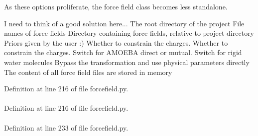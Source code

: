 \-As these options proliferate, the force field class becomes less standalone. 

\-I need to think of a good solution here... \-The root directory of the project \-File names of force fields \-Directory containing force fields, relative to project directory \-Priors given by the user \-:) \-Whether to constrain the charges. \-Whether to constrain the charges. \-Switch for \-A\-M\-O\-E\-B\-A direct or mutual. \-Switch for rigid water molecules \-Bypass the transformation and use physical parameters directly \-The content of all force field files are stored in memory 

\-Definition at line 216 of file forcefield.\-py.

\hypertarget{classforcebalance_1_1forcefield_1_1FF_a4a535d76727fdde57c562d41715b6620}{
\paragraph[{ffdata\-\_\-isxml}]{}}\label{classforcebalance_1_1forcefield_1_1FF_a4a535d76727fdde57c562d41715b6620}


\-Definition at line 216 of file forcefield.\-py.

\hypertarget{classforcebalance_1_1forcefield_1_1FF_a3530616cf2336f54d33f9be169879a6c}{
\paragraph[{\-F\-F\-Molecules}]{}}\label{classforcebalance_1_1forcefield_1_1FF_a3530616cf2336f54d33f9be169879a6c}


\-Definition at line 233 of file forcefield.\-py.

\hypertarget{classforcebalance_1_1forcefield_1_1FF_ac6a1d374e90892f63aa245d5f282eb99}{
\paragraph[{linedestroy\-\_\-save}]{}}\label{classforcebalance_1_1forcefield_1_1FF_ac6a1d374e90892f63aa245d5f282eb99}


